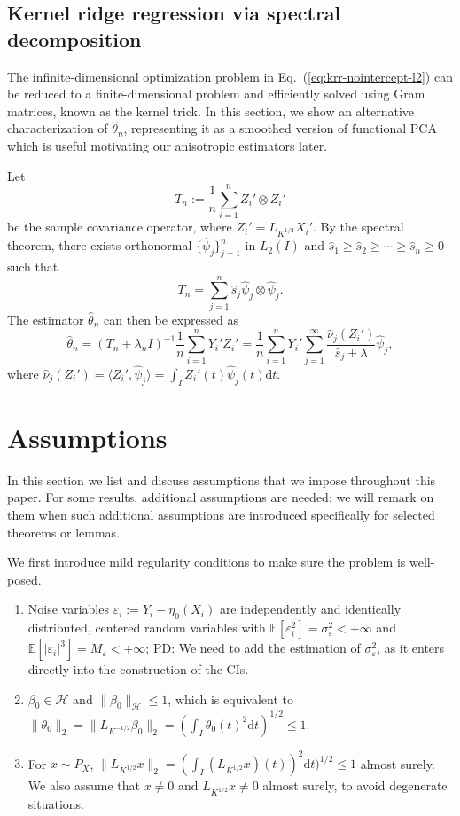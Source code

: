 \documentclass[aos]{imsart}
\renewcommand{\hat}{\widehat}
\newcommand{\ud}{\mathrm d}
\newcommand{\mH}{\mathcal H}
\newcommand{\pd}[1]{%
	{ \color{blue} PD: #1}%
}
\theoremstyle{plain}
\theoremstyle{definition}
\theoremstyle{definition}
\begin{document}
\subsection{Kernel ridge regression via spectral decomposition}

The infinite-dimensional optimization problem in Eq.~(\ref{eq:krr-nointercept-l2}) can be reduced to a finite-dimensional problem and efficiently solved
using Gram matrices, known as the kernel trick. In this section, we show an alternative characterization of $\hat\theta_n$, representing it as a smoothed version of functional PCA
which is useful motivating our anisotropic estimators later.

Let
$$
T_n := \frac{1}{n}\sum_{i=1}^n Z_i'\otimes Z_i'
$$
be the sample covariance operator, where $Z_i'=L_{K^{1/2}}X_i'$. By the spectral theorem, there exists orthonormal $\{\hat\psi_j\}_{j=1}^n$ in $L_2(I)$ and $\hat s_1\geq \hat s_2\geq\cdots\geq \hat s_n\geq 0$ such that
$$
T_n = \sum_{j=1}^n \hat s_j\hat \psi_j\otimes\hat \psi_j.
$$
The estimator $\hat\theta_n$ can then be expressed as
\begin{equation}
\hat\theta_n = (T_n+\lambda_n I)^{-1}\frac{1}{n}\sum_{i=1}^n Y_i'Z_i' = \frac{1}{n}\sum_{i=1}^n Y_i'\sum_{j=1}^{\infty}\frac{\hat\nu_j(Z_i')}{\hat s_j+\lambda}\hat\psi_j,
\label{eq:krr-nointercept-fpca}
\end{equation}
where $\hat\nu_j(Z_i') = \langle Z_i', \hat\psi_j\rangle=\int_I Z_i'(t)\hat\psi_j(t)\ud t$.

\section{Assumptions}

In this section we list and discuss assumptions that we impose throughout this paper. For some results, additional assumptions are needed: 
we will remark on them when such additional assumptions are introduced specifically for selected theorems or lemmas.

We first introduce mild regularity conditions to make sure the problem is well-posed.
\begin{enumerate}
\item[(A1)] Noise variables $\varepsilon_i:=Y_i-\eta_0(X_i)$ are independently and identically distributed, centered random variables with $\mathbb E[\varepsilon_i^2]=\sigma_\varepsilon^2<+\infty$
and $\mathbb E[|\varepsilon_i|^3]=M_\varepsilon < +\infty$; \pd{We need to add the estimation of $\sigma_\varepsilon^2$, as it enters directly into the construction of the CIs.}
\item[(A2)] $\beta_0\in\mH$ and $\|\beta_0\|_\mH\leq 1$, which is equivalent to $\|\theta_0\|_2=\|L_{K^{-1/2}}\beta_0\|_2 =(\int_I \theta_0(t)^2\ud t)^{1/2} \leq 1$.
\item[(A3)] For $x\sim P_X$, $\|L_{K^{1/2}}x\|_2= (\int_I (L_{K^{1/2}}x)(t))^2\ud t)^{1/2}\leq 1$ almost surely. We also assume that $x\neq 0$ and $L_{K^{1/2}}x\neq 0$ almost surely, to avoid degenerate situations.
\end{enumerate}
\end{document}
